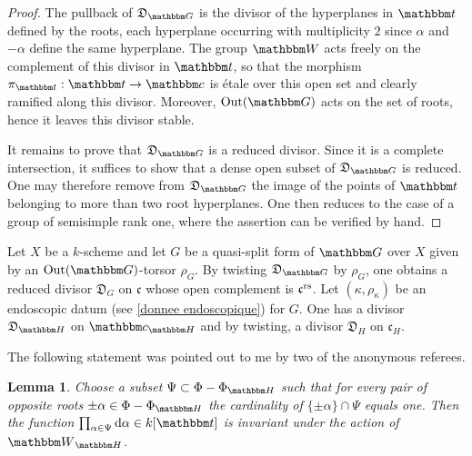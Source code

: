 \documentclass[12pt,english]{smfart}
\numberwithin{equation}{subsection}
\newtheorem{lemma}[equation]{Lemma}
\theoremstyle{remark}
\newcommand\frakc{{\mathfrak c}}
\newcommand\GG{{\mathbbm G}}
\newcommand\HH{{\mathbbm H}}
\newcommand\bbH{{\mathbbm H}}
\newcommand\bbW{{\mathbbm W}}
\newcommand\bbt{{\mathbbm t}}
\newcommand\bbc{{\mathbbm c}}
\newcommand\Out{{\rm Out}}
\newcommand\rs{{\rm rs}}
\newcommand\discrim{\mathfrak D}
\begin{document}
\begin{proof}
The pullback of $\discrim_\GG$ is the divisor of the hyperplanes in $\bbt$ defined by the roots, each hyperplane occurring with multiplicity $2$ since $\alpha$ and $-\alpha$ define the same hyperplane. The group $\bbW$ acts freely on the complement of this divisor in $\bbt$, so that the morphism $\pi_\bbt:\bbt\rightarrow\bbc$ is \'{e}tale over this open set and clearly ramified along this divisor. Moreover, $\Out(\GG)$ acts on the set of roots, hence it leaves this divisor stable.

It remains to prove that $\discrim_\GG$ is a reduced divisor. Since it is a complete intersection, it suffices to show that a dense open subset of $\discrim_\GG$ is reduced. %
One may therefore remove from $\discrim_\GG$ the image of the points of $\bbt$ belonging to more than two root hyperplanes. One then reduces to the case of a group of semisimple rank one, where the assertion can be verified by hand.
\end{proof}

Let $X$ be a $k$-scheme and let $G$ be a quasi-split form of $\GG$ over $X$ given by an $\Out(\GG)$-torsor $\rho_G$. By twisting $\discrim_\GG$ by $\rho_G$, one obtains a reduced divisor $\discrim_G$ on $\frakc$ whose open complement is $\frakc^\rs$. Let $(\kappa,\rho_\kappa)$ be an endoscopic datum (see \ref{donnee endoscopique}) for $G$. One has a divisor $\discrim_\bbH$ on $\bbc_\HH$ and by twisting, a divisor $\discrim_H$ on $\frakc_H$.

The following statement was pointed out to me by two of the anonymous referees.

\begin{lemma}\label{produit dalpha invariant}
Choose a subset $\Psi\subset\Phi-\Phi_\bbH$ such that for every pair of opposite roots $\pm\alpha\in\Phi-\Phi_\bbH$ the cardinality of $\{\pm\alpha\}\cap\Psi$ equals one. Then the function $\prod_{\alpha\in\Psi}{\rm d}\alpha\in k[\bbt]$ is invariant under the action of $\bbW_\bbH$.
\end{lemma}
\end{document}
